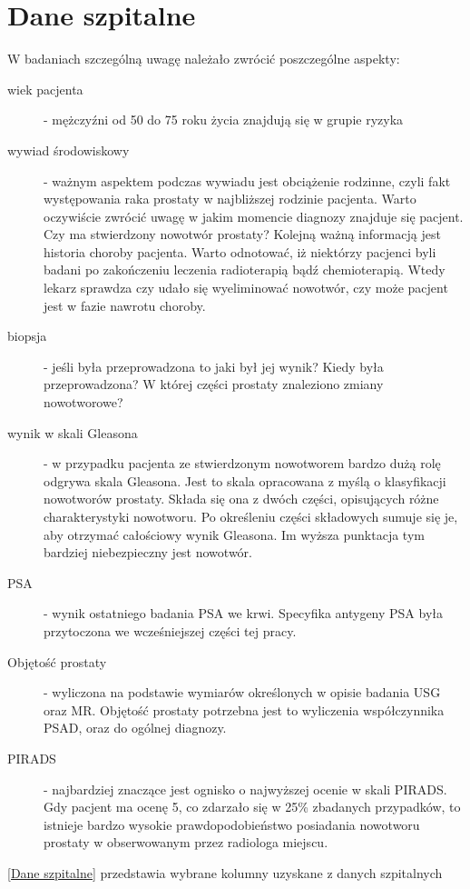 \documentclass[a4paper,11pt,twoside]{report}
\theoremstyle{definition}
\begin{document}
\section{Dane szpitalne}
W badaniach szczególną uwagę należało zwrócić poszczególne aspekty: \\
\begin{description}
\item[wiek pacjenta] - mężczyźni od 50 do 75 roku życia znajdują się w grupie ryzyka
\item[wywiad środowiskowy] - ważnym aspektem podczas wywiadu jest obciążenie rodzinne, czyli fakt występowania raka prostaty w najbliższej rodzinie pacjenta. Warto oczywiście zwrócić uwagę w jakim momencie diagnozy znajduje się pacjent. Czy ma stwierdzony nowotwór prostaty? Kolejną ważną informacją jest historia choroby pacjenta. Warto odnotować, iż niektórzy pacjenci byli badani po zakończeniu leczenia radioterapią bądź chemioterapią. Wtedy lekarz sprawdza czy udało się wyeliminować nowotwór, czy może pacjent jest w fazie nawrotu choroby.
\item[biopsja] - jeśli była przeprowadzona to jaki był jej wynik? Kiedy była przeprowadzona? W której części prostaty znaleziono zmiany nowotworowe?
\item[wynik w skali Gleasona] - w przypadku pacjenta ze stwierdzonym nowotworem bardzo dużą rolę odgrywa skala Gleasona. Jest to skala opracowana z myślą o klasyfikacji nowotworów prostaty. Składa się ona z dwóch części, opisujących różne charakterystyki nowotworu. Po określeniu części składowych sumuje się je, aby otrzymać całościowy wynik Gleasona. Im wyższa punktacja tym bardziej niebezpieczny jest nowotwór.
\item[PSA] - wynik ostatniego badania PSA we krwi. Specyfika antygeny PSA była przytoczona we wcześniejszej części tej pracy. 
\item[Objętość prostaty] - wyliczona na podstawie wymiarów określonych w opisie badania USG oraz MR. Objętość prostaty potrzebna jest to wyliczenia współczynnika PSAD, oraz do ogólnej diagnozy. 
\item[PIRADS] - najbardziej znaczące jest ognisko o najwyższej ocenie w skali PIRADS. Gdy pacjent ma ocenę 5, co zdarzało się w 25\% zbadanych przypadków, to istnieje bardzo wysokie prawdopodobieństwo posiadania nowotworu prostaty w obserwowanym przez radiologa miejscu. 
\end{description}
\par
\ref{Dane szpitalne} przedstawia wybrane kolumny uzyskane z danych szpitalnych
\end{document}
